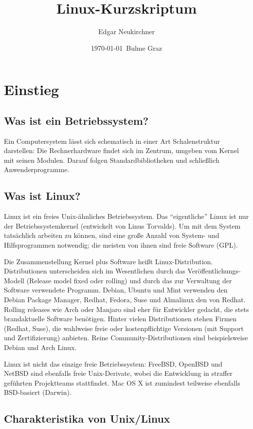 \documentclass[11pt]{article}
\title{Linux-Kurzskriptum}
\author{Edgar Neukirchner}
\date{\mydate\today\ Bulme Graz}
\begin{document}
\maketitle
\newpage
\tableofcontents
\newpage

\section{Einstieg} 
\subsection{Was ist ein Betriebssystem?}
Ein Computersystem lässt sich schematisch in einer Art Schalenstruktur
darstellen: Die Rechnerhardware findet sich im Zentrum, umgeben vom
Kernel mit seinen Modulen. Darauf folgen Standardbibliotheken und
schließlich Anwenderprogramme.

\subsection{Was ist Linux?} 
Linux ist ein freies Unix-ähnliches Betriebssystem. Das ``eigentliche''
Linux ist nur der Betriebssystemkernel (entwickelt von Linus Torvalds).
Um mit dem System tatsächlich arbeiten zu können, sind eine große Anzahl
von System- und Hilfsprogrammen notwendig; die meisten von ihnen sind
freie Software (GPL).

Die Zusammenstellung Kernel plus Software heißt Linux-Distribution. Distributionen unterscheiden sich im Wesentlichen durch das Veröffentlichungs-Modell (Release model fixed oder rolling) und durch das zur Verwaltung der Software verwendete Programm. Debian, Ubuntu und Mint verwenden den Debian Package Manager, Redhat, Fedora, Suse und Almalinux den von Redhat. Rolling releases wie Arch oder Manjaro sind eher für Entwickler gedacht, die stets brandaktuelle Software benötigen.
Hinter vielen Distributionen stehen Firmen (Redhat, Suse), die wahlweise freie oder kostenpflichtige Versionen (mit Support und Zertifizierung) anbieten. Reine Community-Distributionen sind beispielsweise Debian und Arch Linux.

Linux ist nicht das einzige freie Betriebssystem: FreeBSD, OpenBSD und
NetBSD sind ebenfalls freie Unix-Derivate, wobei die Entwicklung in
straffer geführten Projektteams stattfindet. Mac OS X ist zumindest
teilweise ebenfalls BSD-basiert (Darwin).

\subsection{Charakteristika von Unix/Linux}
\end{document}
